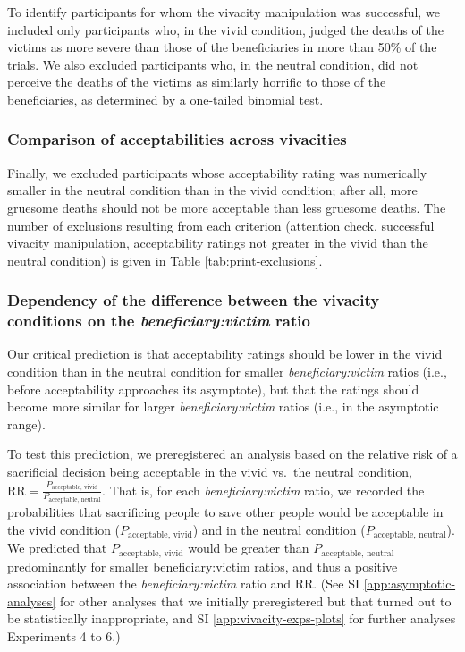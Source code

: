 \documentclass[
]{article}
\begin{document}
To identify participants for whom the vivacity manipulation was successful, we included only participants who, in the vivid condition, judged the deaths of the victims as more severe than those of the beneficiaries in more than 50\% of the trials. We also excluded participants who, in the neutral condition, did not perceive the deaths of the victims as similarly horrific to those of the beneficiaries, as determined by a one-tailed binomial test.

\subsubsection{Comparison of acceptabilities across vivacities}\label{comparison-of-acceptabilities-across-vivacities}

Finally, we excluded participants whose acceptability rating was numerically smaller in the neutral condition than in the vivid condition; after all, more gruesome deaths should not be more acceptable than less gruesome deaths. The number of exclusions resulting from each criterion (attention check, successful vivacity manipulation, acceptability ratings not greater in the vivid than the neutral condition) is given in Table \ref{tab:print-exclusions}.

\clearpage

\subsubsection{\texorpdfstring{Dependency of the difference between the vivacity conditions on the \emph{beneficiary:victim} ratio}{Dependency of the difference between the vivacity conditions on the beneficiary:victim ratio}}\label{dependency-of-the-difference-between-the-vivacity-conditions-on-the-beneficiaryvictim-ratio}

Our critical prediction is that acceptability ratings should be lower in the vivid condition than in the neutral condition for smaller \emph{beneficiary:victim} ratios (i.e., before acceptability approaches its asymptote), but that the ratings should become more similar for larger \emph{beneficiary:victim} ratios (i.e., in the asymptotic range).

To test this prediction, we preregistered an analysis based on the relative risk of a sacrificial decision being acceptable in the vivid vs.~the neutral condition, \(\mathrm{RR}= \frac{P_{\text{acceptable, vivid}}}{P_{\text{acceptable, neutral}}}\). That is, for each \emph{beneficiary:victim} ratio, we recorded the probabilities that sacrificing people to save other people would be acceptable in the vivid condition (\(P_{\text{acceptable, vivid}}\)) and in the neutral condition (\(P_{\text{acceptable, neutral}}\)). We predicted that \(P_{\text{acceptable, vivid}}\) would be greater than \(P_{\text{acceptable, neutral}}\) predominantly for smaller beneficiary:victim ratios, and thus a positive association between the \emph{beneficiary:victim} ratio and \(\mathrm{RR}\). (See SI \ref{app:asymptotic-analyses} for other analyses that we initially preregistered but that turned out to be statistically inappropriate, and SI \ref{app:vivacity-exps-plots} for further analyses Experiments 4 to 6.)
\end{document}
